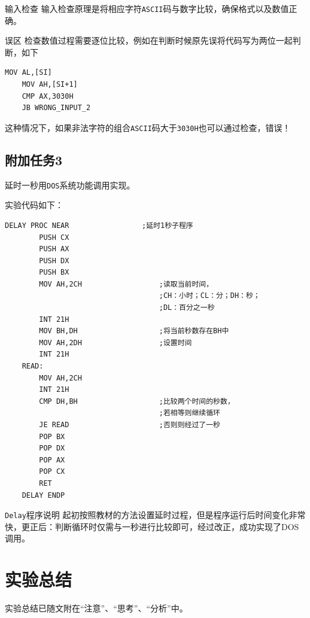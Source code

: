 \documentclass[11pt]{SEU-Digital-Report}
\begin{document}
\begin{analyze}{输入检查}{}
    输入检查原理是将相应字符\texttt{ASCII}码与数字比较，确保格式以及数值正确。
    \begin{note}{误区}{}
        检查数值过程需要逐位比较，例如在判断时候原先误将代码写为两位一起判断，如下
        \begin{lstlisting}[language={[x86masm]Assembler},title=code]
    MOV AL,[SI]		
    MOV AH,[SI+1]
    CMP AX,3030H            
    JB WRONG_INPUT_2       
        \end{lstlisting}
        这种情况下，如果非法字符的组合\texttt{ASCII}码大于\texttt{3030H}也可以通过检查，错误！
    \end{note}
\end{analyze}



\subsection{附加任务3}
延时一秒用\texttt{DOS}系统功能调用实现。

实验代码如下：
\begin{lstlisting}[language={[x86masm]Assembler},title=code]
    DELAY PROC NEAR                 ;延时1秒子程序     
        PUSH CX
        PUSH AX
        PUSH DX
        PUSH BX
        MOV AH,2CH                  ;读取当前时间，
                                    ;CH：小时；CL：分；DH：秒；
                                    ;DL：百分之一秒
        INT 21H
        MOV BH,DH                   ;将当前秒数存在BH中
        MOV AH,2DH                  ;设置时间
        INT 21H
    READ:
        MOV AH,2CH
        INT 21H
        CMP DH,BH                   ;比较两个时间的秒数，
                                    ;若相等则继续循环
        JE READ                     ;否则则经过了一秒
        POP BX
        POP DX
        POP AX
        POP CX
        RET
    DELAY ENDP   
\end{lstlisting}
\begin{analyze}{\texttt{Delay}程序说明}{}
    起初按照教材的方法设置延时过程，但是程序运行后时间变化非常快，更正后：判断循环时仅需与一秒进行比较即可，经过改正，成功实现了DOS调用。
\end{analyze}



\section{实验总结}
实验总结已随文附在“注意”、“思考”、“分析”中。

\printbibliography
\end{document}
